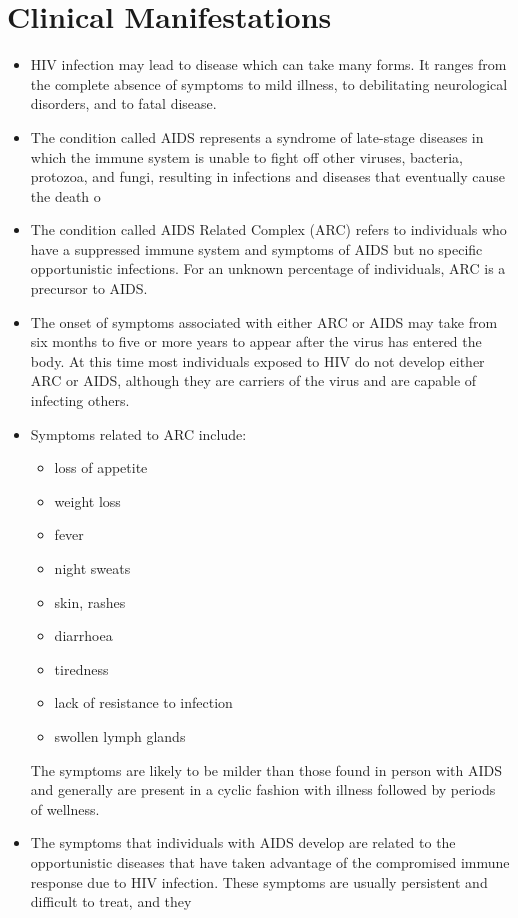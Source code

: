 \section{Clinical Manifestations}

\begin{itemize}
\item HIV infection may lead to disease which can take many forms. It ranges from the
complete absence of symptoms to mild illness, to debilitating neurological disorders, and
to fatal disease.
\item The condition called AIDS represents a syndrome of late-stage diseases in which the
immune system is unable to fight off other viruses, bacteria, protozoa, and fungi, resulting
in infections and diseases that eventually cause the death o
\item The condition called AIDS Related Complex (ARC) refers to individuals who have a
suppressed immune system and symptoms of AIDS but no specific opportunistic
infections. For an unknown percentage of individuals, ARC is a precursor to AIDS.
\item The onset of symptoms associated with either ARC or AIDS may take from six months to
five or more years to appear after the virus has entered the body. At this time most
individuals exposed to HIV do not develop either ARC or AIDS, although they are carriers
of the virus and are capable of infecting others.
\item Symptoms related to ARC include:
	\begin{itemize}
	\item loss of appetite
	\item weight loss
	\item fever
	\item night sweats
	\item skin, rashes
	\item diarrhoea
	\item tiredness
	\item lack of resistance to infection
	\item swollen lymph glands
	\end{itemize}
	The symptoms are likely to be milder than those found in person with AIDS and generally are
present in a cyclic fashion with illness followed by periods of wellness.
\item The symptoms that individuals with AIDS develop are related to the opportunistic
diseases that have taken advantage of the compromised immune response due to HIV
infection. These symptoms are usually persistent and difficult to treat, and they

\end{itemize}
